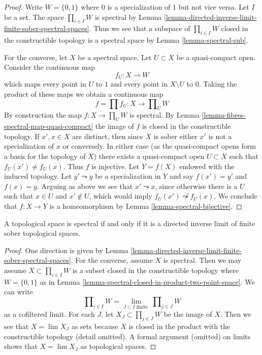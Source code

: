 \begin{proof}
Write $W = \{0, 1\}$ where $0$ is a specialization of $1$ but not vice versa.
Let $I$ be a set. The space $\prod_{i \in I} W$ is spectral by
Lemma \ref{lemma-directed-inverse-limit-finite-sober-spectral-spaces}.
Thus we see that a subspace of $\prod_{i \in I} W$ closed in the
constructible topology is
a spectral space by Lemma \ref{lemma-spectral-sub}.

\medskip\noindent
For the converse, let $X$ be a spectral space. Let $U \subset X$ be a
quasi-compact open. Consider the continuous map
$$
f_U : X \longrightarrow W
$$
which maps every point in $U$ to $1$ and every point in $X \setminus U$ to $0$.
Taking the product of these maps we obtain a continuous map
$$
f = \prod f_U : X \longrightarrow \prod\nolimits_U W
$$
By construction the map $f : X \to \prod\nolimits_U W$ is spectral. By
Lemma \ref{lemma-fibres-spectral-map-quasi-compact}
the image of $f$ is closed in the constructible topology.
If $x', x \in X$ are distinct, then since $X$ is sober either $x'$
is not a specialization of $x$ or conversely. In either case (as the
quasi-compact opens form a basis for the topology of $X$) there
exists a quasi-compact open $U \subset X$ such that $f_U(x') \not = f_U(x)$.
Thus $f$ is injective. Let $Y = f(X)$ endowed with the induced topology.
Let $y' \leadsto y$ be a specialization in $Y$ and say
$f(x') = y'$ and $f(x) = y$. Arguing as above we see that
$x' \leadsto x$, since otherwise there is a $U$ such that
$x \in U$ and $x' \not \in U$, which would imply
$f_U(x') \not \leadsto f_U(x)$.
We conclude that $f : X \to Y$ is a homeomorphism by
Lemma \ref{lemma-spectral-bijective}.
\end{proof}

\begin{lemma}
\label{lemma-spectral-inverse-limit-finite-sober-spaces}
A topological space is spectral if and only if it is a directed
inverse limit of finite sober topological spaces.
\end{lemma}

\begin{proof}
One direction is given by
Lemma \ref{lemma-directed-inverse-limit-finite-sober-spectral-spaces}.
For the converse, assume $X$ is spectral. Then we
may assume $X \subset \prod_{i \in I} W$ is a subset closed
in the constructible topology where $W = \{0, 1\}$ as in
Lemma \ref{lemma-spectral-closed-in-product-two-point-space}.
We can write
$$
\prod\nolimits_{i \in I} W =
\lim_{J \subset I\text{ finite }} \prod\nolimits_{j \in J} W
$$
as a cofiltered limit.
For each $J$, let $X_J \subset \prod_{j \in J} W$ be the image of $X$.
Then we see that $X = \lim X_J$ as sets because $X$ is closed in
the product with the constructible topology (detail omitted).
A formal argument (omitted) on limits shows that $X = \lim X_J$ as topological
spaces.
\end{proof}

